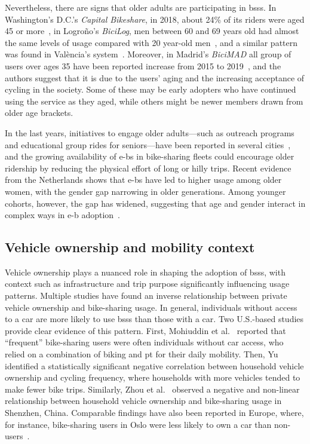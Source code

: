     Nevertheless, there are signs that older adults are participating in \acp{bss}. In Washington's D.C.'s \textit{Capital Bikeshare}, in 2018, about 24\% of its riders were aged 45 or more~\cite{Walljasper2018}, in Logroño's \textit{BiciLog}, men between 60 and 69 years old had almost the same levels of usage compared with 20 year-old men~\cite{CortezOrdonez2023}, and a similar pattern was found in València's system~\cite{PansSancho2023}. Moreover, in Madrid's \textit{BiciMAD} all group of users over ages 35 have been reported increase from 2015 to 2019~\cite{Julio2022}, and the authors suggest that it is due to the users' aging and the increasing acceptance of cycling in the society. Some of these may be early adopters who have continued using the service as they aged, while others might be newer members drawn from older age brackets. 

    In the last years, initiatives to engage older adults—such as outreach programs and educational group rides for seniors—have been reported in several cities~\cite{Ghisallo2023, BikeLNK2025}, and the growing availability of \acp{e-b} in bike-sharing fleets could encourage older ridership by reducing the physical effort of long or hilly trips. Recent evidence from the Netherlands shows that \acp{e-b} have led to higher usage among older women, with the gender gap narrowing in older generations. Among younger cohorts, however, the gap has widened, suggesting that age and gender interact in complex ways in \ac{e-b} adoption~\cite{Huang2024}.

    \subsection{Vehicle ownership and mobility context}

    Vehicle ownership plays a nuanced role in shaping the adoption of \acp{bss}, with context such as infrastructure and trip purpose significantly influencing usage patterns. Multiple studies have found an inverse relationship between private vehicle ownership and bike-sharing usage. In general, individuals without access to a car are more likely to use \acp{bss} than those with a car. Two U.S.-based studies provide clear evidence of this pattern. First, Mohiuddin et al.~\cite{Mohiuddin2024} reported that “frequent” bike-sharing users were often individuals without car access, who relied on a combination of biking and \ac{pt} for their daily mobility. Then, Yu~\cite{Yu2024} identified a statistically significant negative correlation between household vehicle ownership and cycling frequency, where households with more vehicles tended to make fewer bike trips. Similarly, Zhou et al.~\cite{Zhou2025} observed a negative and non-linear relationship between household vehicle ownership and bike-sharing usage in Shenzhen, China. Comparable findings have also been reported in Europe, where, for instance, bike-sharing users in Oslo were less likely to own a car than non-users~\cite{Mouratidis2022}.
    
